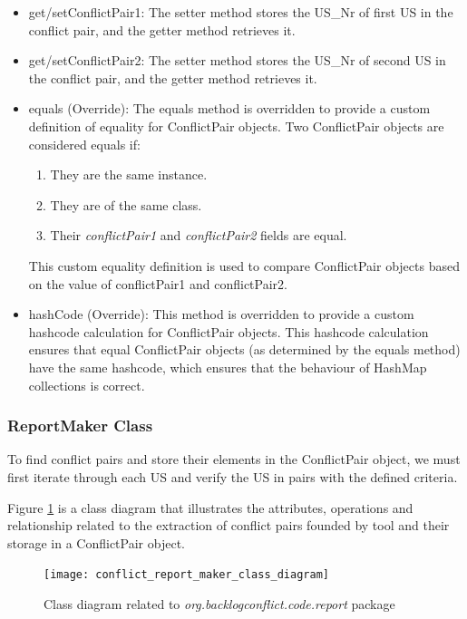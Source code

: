 \begin{itemize}
	\item get/setConflictPair1: The setter method stores the US\_Nr of first US in the conflict pair, and the getter method retrieves it.
	
	\item get/setConflictPair2: The setter method stores the US\_Nr of second US in the conflict pair, and the getter method retrieves it.
	
	\item equals (Override): The equals method is overridden to provide a custom definition of equality for ConflictPair objects. Two ConflictPair objects are considered equals if:
	\begin{enumerate}
		\item They are the same instance.
		
		\item They are of the same class.
		
		\item Their \textit{conflictPair1} and  \textit{conflictPair2} fields are equal.
		
	\end{enumerate}
	This custom equality definition is used to compare ConflictPair objects based on the value of conflictPair1 and conflictPair2.

	\item hashCode (Override): This method is overridden to provide a custom hashcode calculation for ConflictPair objects. This hashcode calculation ensures that equal ConflictPair objects (as determined by the equals method) have the same hashcode, which ensures that the behaviour of HashMap collections is correct.
	
\end{itemize}

\subsubsection*{ReportMaker Class}
To find conflict pairs and store their elements in the ConflictPair object, we must first iterate through each US and verify the US in pairs with the defined criteria. 

Figure \ref{fig:conflict_report_maker_class_diagram} is a class diagram that illustrates the attributes, operations and relationship related to the extraction of conflict pairs founded by tool and their storage in a ConflictPair object.
\begin{figure}[h]
	\centering
	\texttt{[image: conflict\_report\_maker\_class\_diagram]}
	\caption{Class diagram related to \textit{org.backlogconflict.code.report} package }\label{fig:conflict_report_maker_class_diagram}
\end{figure} 

